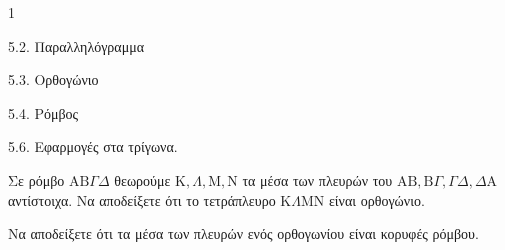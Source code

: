 \begin{ylh}{1}
    \item 5.2. Παραλληλόγραμμα
    \item 5.3. Ορθογώνιο
    \item 5.4. Ρόμβος
    \item 5.6. Εφαρμογές στα τρίγωνα.
\end{ylh}
\begin{alist}
    \item Σε ρόμβο $\mathrm{A}\mathrm{B}\Gamma\Delta$ θεωρούμε $\mathrm{K}, \Lambda, \mathrm{M}, \mathrm{N}$ τα μέσα των πλευρών του $\mathrm{A}\mathrm{B}, \mathrm{B}\Gamma, \Gamma\Delta, \Delta\mathrm{A}$ αντίστοιχα. Να αποδείξετε ότι το τετράπλευρο $\mathrm{K}\Lambda\mathrm{M}\mathrm{N}$ είναι ορθογώνιο. 
    \item Να αποδείξετε ότι τα μέσα των πλευρών ενός ορθογωνίου είναι κορυφές ρόμβου. 
\end{alist}

